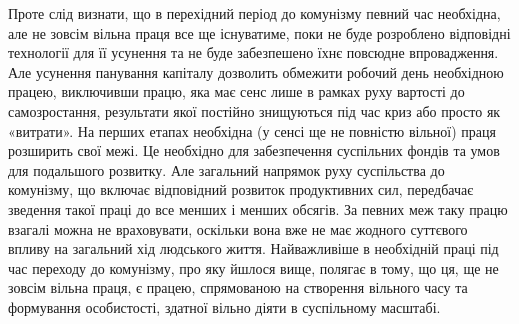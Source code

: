 \documentclass[../main]{subfiles}
\begin{document}
Проте слід визнати, що в перехідний період до комунізму певний час необхідна, але не зовсім вільна праця все ще існуватиме, поки не буде розроблено відповідні технології для її усунення та не буде забезпешено їхнє повсюдне впровадження. Але усунення панування капіталу дозволить обмежити робочий день необхідною працею, виключивши працю, яка має сенс лише в рамках руху вартості до самозростання, результати якої постійно знищуються під час криз або просто як «витрати». На перших етапах необхідна (у сенсі ще не повністю вільної) праця розширить свої межі. Це необхідно для забезпечення суспільних фондів та умов для подальшого розвитку. Але загальний напрямок руху суспільства до комунізму, що включає відповідний розвиток продуктивних сил, передбачає зведення такої праці до все менших і менших обсягів. За певних меж таку працю взагалі можна не враховувати, оскільки вона вже не має жодного суттєвого впливу на загальний хід людського життя. Найважливіше в необхідній праці під час переходу до комунізму, про яку йшлося вище, полягає в тому, що ця, ще не зовсім вільна праця, є працею, спрямованою на створення вільного часу та формування особистості, здатної вільно діяти в суспільному масштабі.
\end{document}
